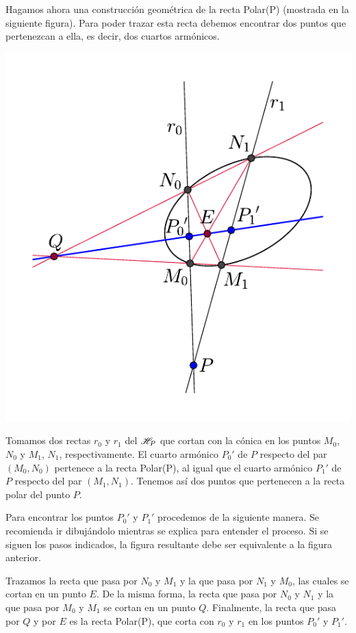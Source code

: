  Hagamos ahora una construcción geométrica de la recta Polar(P) (mostrada en la siguiente figura). Para poder trazar esta recta debemos encontrar dos puntos que pertenezcan a ella, es decir, dos cuartos armónicos.
\begin{center}
	\includegraphics[scale=.8]{Graficos/Conicas/ConstruccionPolar}
\end{center}
Tomamos dos rectas $r_0$ y $r_1$ del $\mathscr{H}_P$ que cortan con la cónica en los puntos $M_0$, $N_0$ y $M_1$, $N_1$, respectivamente. El cuarto armónico $P_0'$ de $P$ respecto del par $(M_0,N_0)$ pertenece a la recta Polar(P), al igual que el cuarto armónico $P_1'$ de $P$ respecto del par $(M_1,N_1)$. Tenemos así dos puntos que pertenecen a la recta polar del punto $P$.

Para encontrar los puntos $P_0'$ y $P_1'$ procedemos de la siguiente manera. Se recomienda ir dibujándolo mientras se explica para entender el proceso. Si se siguen los pasos indicados, la figura resultante debe ser equivalente a la figura anterior.

Trazamos la recta que pasa por $N_0$ y $M_1$ y la que pasa por $N_1$ y $M_0$, las cuales se cortan en un punto $E$. De la misma forma, la recta que pasa por $N_0$ y $N_1$ y la que pasa por $M_0$ y $M_1$ se cortan en un punto $Q$. Finalmente, la recta que pasa por $Q$ y por $E$ es la recta Polar(P), que corta con $r_0$ y $r_1$ en los puntos $P_0'$ y $P_1'$.

